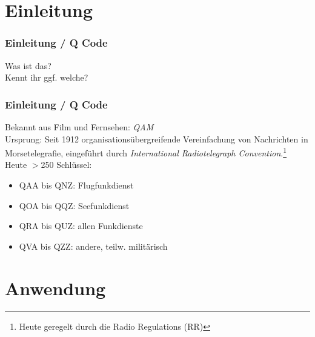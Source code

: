

\subtitle{Betriebstechnik/Vorschriften 03: \\
          Der "Q-Schlüssel"                \\[2em]}
\date{Stand 28.10.2015}



\section*{Einleitung}

\begin{frame}
    \frametitle{Einleitung / Q Code}
    \begin{center}
        \Large{Was ist das?} \\
        \Large{Kennt ihr ggf. welche?}
    \end{center}
\end{frame}

\begin{frame}
    \frametitle{Einleitung / Q Code}

    Bekannt aus Film und Fernsehen: \emph{QAM} \\[2em]

    Ursprung: Seit 1912 organisationsübergreifende Vereinfachung von Nachrichten
    in Morsetelegrafie, eingeführt durch \emph{International Radiotelegraph
    Convention}.\footnote{\tiny Heute geregelt durch die Radio Regulations (RR)}
    \\[2em]
    
    Heute $>$250 Schlüssel:

    \begin{itemize}
        \item QAA bis QNZ: Flugfunkdienst
        \item QOA bis QQZ: Seefunkdienst
        \item QRA bis QUZ: allen Funkdienste
        \item QVA bis QZZ: andere, teilw. militärisch
    \end{itemize}

\end{frame}

\section*{Anwendung}

